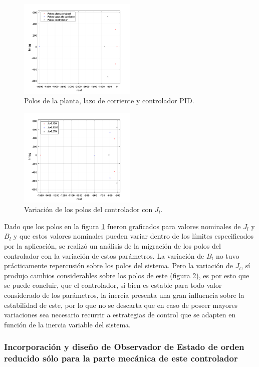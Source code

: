 \documentclass[10pt]{article}
\begin{document}
	\begin{figure}[!h]
	\centering
	\includegraphics[width=0.5\textwidth]{Polosmodelos.png}
	\caption{\label{fig:Polosmodelos}Polos de la planta, lazo de corriente y controlador PID.}
	\end{figure}
	\begin{figure}[h!]
	\centering
	\includegraphics[width=0.5\textwidth]{PoloJeq.png}
	\caption{\label{fig:PoloJeq}Variación de los polos del controlador con $J_{l}$.}
	\end{figure}
	Dado que los polos en la figura \ref{fig:Polosmodelos} fueron graficados para valores nominales de $J_{l}$ y $B_{l}$ y que estos valores nominales pueden variar dentro de los límites especificados por la aplicación, se realizó un análisis de la migración de los polos del controlador con la variación de estos parámetros.
	La variación de $B_{l}$ no tuvo prácticamente repercusión sobre los polos del sistema.
	Pero la variación de $J_{l}$, sí produjo cambios considerables sobre los polos de este (figura \ref{fig:PoloJeq}), es por esto que se puede concluir, que el controlador, si bien es estable para todo valor considerado de los parámetros, la inercia presenta una gran influencia sobre la estabilidad de este, por lo que no se descarta que en caso de poseer mayores variaciones sea necesario recurrir a estrategias de control que se adapten en función de la inercia variable del sistema.
	
	
\subsubsection{Incorporación y diseño de Observador de Estado de orden reducido sólo para la parte mecánica de este controlador}
\end{document}

